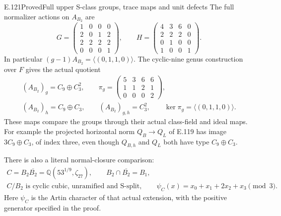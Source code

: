 \begin{statement}{E.121}{Proved}{Full upper S-class groups, trace maps and unit defects}
The full normalizer actions on $A_{B_2}$ are
\[
 G=\begin{pmatrix}
 1&0&0&0\\2&0&1&2\\2&2&2&2\\0&0&0&1
 \end{pmatrix},\qquad
 H=\begin{pmatrix}
 4&3&6&0\\2&2&2&0\\0&1&0&0\\1&0&0&1
 \end{pmatrix}.
 \tag{E121.6}
\]
In particular $(g-1)A_{B_2}=\langle(0,1,1,0)\rangle$.
The cyclic-nine genus construction over $F$ gives the actual
quotient
\[
 \begin{gathered}
 (A_{B_2})_g=C_9\oplus C_3^2,\qquad
 \pi_g=
 \begin{pmatrix}5&3&6&6\\1&1&2&1\\0&0&0&2\end{pmatrix},\\
 (A_{B_2})_h=C_9\oplus C_3,\qquad
 (A_{B_2})_{g,h}=C_3^2,\qquad
 \ker\pi_g=\langle(0,1,1,0)\rangle .
 \end{gathered}
 \tag{E121.7}
\]
These maps compare the groups through their actual class-field
and ideal maps. For example the projected horizontal norm
$Q_B\to Q_L$ of E.119 has image $3C_9\oplus C_3$, of index
three, even though $Q_{B,h}$ and $Q_L$ both have type
$C_9\oplus C_3$.

There is also a literal normal-closure comparison:
\[
 \begin{gathered}
 C=B_2\overline{B_2}
    =\mathbb Q(53^{1/9},\zeta_{27}),\qquad
 B_2\cap\overline{B_2}=B_1,\\
 C/B_2\text{ is cyclic cubic, unramified and S-split},\qquad
 \psi_C(x)=x_0+x_1+2x_2+x_3\pmod3.
 \end{gathered}
 \tag{E121.8}
\]
Here $\psi_C$ is the Artin character of that actual extension,
with the positive generator specified in the proof.


\end{statement}
